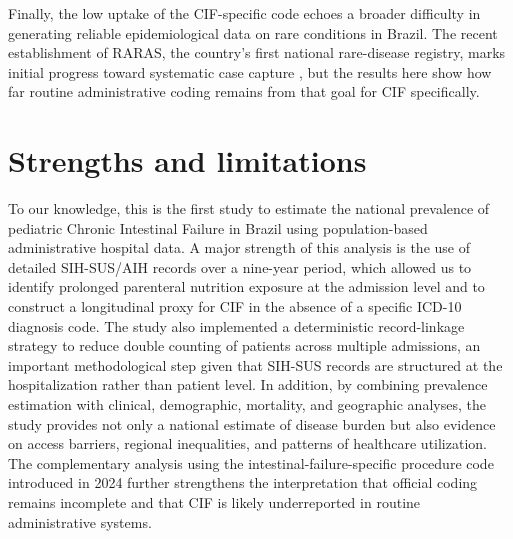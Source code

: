 \documentclass[12pt,a4paper]{article}
\theoremstyle{plain}
\theoremstyle{definition}
\theoremstyle{remark}
\begin{document}
Finally, the low uptake of the CIF-specific code echoes a broader difficulty in generating reliable epidemiological data on rare conditions in Brazil. The recent establishment of RARAS, the country's first national rare-disease registry, marks initial progress toward systematic case capture \cite{andrade2025paving}, but the results here show how far routine administrative coding remains from that goal for CIF specifically.


\section*{Strengths and limitations}

To our knowledge, this is the first study to estimate the national prevalence of pediatric Chronic Intestinal Failure in Brazil using population-based administrative hospital data. A major strength of this analysis is the use of detailed SIH-SUS/AIH records over a nine-year period, which allowed us to identify prolonged parenteral nutrition exposure at the admission level and to construct a longitudinal proxy for CIF in the absence of a specific ICD-10 diagnosis code. The study also implemented a deterministic record-linkage strategy to reduce double counting of patients across multiple admissions, an important methodological step given that SIH-SUS records are structured at the hospitalization rather than patient level. In addition, by combining prevalence estimation with clinical, demographic, mortality, and geographic analyses, the study provides not only a national estimate of disease burden but also evidence on access barriers, regional inequalities, and patterns of healthcare utilization. The complementary analysis using the intestinal-failure-specific procedure code introduced in 2024 further strengthens the interpretation that official coding remains incomplete and that CIF is likely underreported in routine administrative systems.
\end{document}
